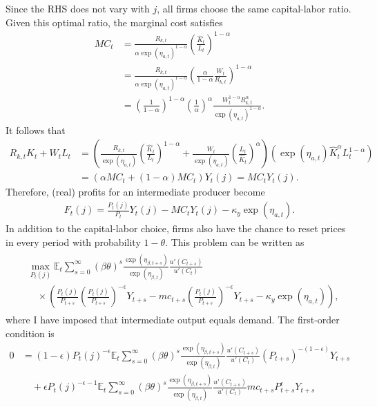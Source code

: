 \documentclass[12 pt, oneside]{article}
\theoremstyle{definition}
\theoremstyle{definition}
\theoremstyle{definition}
\newcommand{\E}{\mathbb{E}}
\begin{document}
Since the RHS does not vary with $j$, all firms choose the same capital-labor ratio. Given this optimal ratio, the marginal cost satisfies
\begin{align*}
  MC_t & = \frac{R_{k, t}}{\alpha \exp(\eta_{a, t})^{1 - \alpha}}\left(\frac{\hat{K}_t}{L_t}\right)^{1 - \alpha}\\
       & =  \frac{R_{k, t}}{\alpha \exp(\eta_{a, t})^{1 - \alpha}}\left(\frac{\alpha}{1 - \alpha} \frac{W_t}{R_{k, t}}\right)^{1 - \alpha}\\
       & =  \left(\frac{1}{1 - \alpha}\right)^{1 - \alpha}\left(\frac{1}{\alpha}\right)^{\alpha}\frac{W_t^{1 - \alpha}R_{k, t}^{\alpha}}{ \exp(\eta_{a, t})^{1 - \alpha}}.
\end{align*}
It follows that
\begin{align*}
  R_{k, t}\hat{K}_t + W_tL_t & = \left(\frac{R_{k, t}}{\exp(\eta_{a, t})}\left(\frac{\hat{K}_t}{L_t}\right)^{1 - \alpha} + \frac{W_t}{\exp(\eta_{a, t})}\left(\frac{L_t}{\hat{K}_t}\right)^{\alpha}\right)(\exp(\eta_{a, t})\hat{K}_t^\alpha L_t^{1 - \alpha})\\
                       & = \left(\alpha MC_t + (1 - \alpha)MC_t\right)Y_t(j) = MC_t Y_t(j).
\end{align*}
Therefore, (real) profits for an intermediate producer become
\begin{align}
  F_t(j) = \frac{P_t(j)}{P_t}Y_t(j) - MC_t Y_t(j) - \kappa_y \exp(\eta_{a, t}).
\end{align}
In addition to the capital-labor choice, firms also have the chance to reset prices in every period with probability $1 - \theta$. This problem can be
written as
\begin{align}
  \begin{split}
  &\max_{P_t(j)} \E_t\sum_{s = 0}^\infty(\beta \theta)^s\frac{\exp(\eta_{\beta, t + s})}{\exp(\eta_{\beta, t})}\frac{u'(C_{t + s})}{u'(C_t)}\\
&\quad \times\left(\frac{P_t(j)}{P_{t + s}}\left(\frac{P_t(j)}{P_{t + s}}\right)^{-\epsilon}Y_{t + s} - mc_{t + s}\left(\frac{P_t(j)}{P_{t + s}}\right)^{-\epsilon}Y_{t + s} - \kappa_y\exp(\eta_{a, t})\right),
  \end{split}
\end{align}
where I have imposed that intermediate output equals demand. The first-order condition is
\begin{align*}
0 & =  (1 - \epsilon)P_t(j)^{-\epsilon}\E_t\sum_{s = 0}^\infty (\beta\theta)^s \frac{\exp(\eta_{\beta, t + s})}{\exp(\eta_{\beta, t})}\frac{u'(C_{t + s})}{u'(C_t)}(P_{t + s})^{-(1 - \epsilon)}Y_{t + s}\\
  &\quad + \epsilon P_t(j)^{-\epsilon - 1}\E_t\sum_{s = 0}^\infty (\beta\theta)^s \frac{\exp(\eta_{\beta, t + s})}{\exp(\eta_{\beta, t})}\frac{u'(C_{t + s})}{u'(C_t)} mc_{t + s}P_{t + s}^{\epsilon}Y_{t + s}
\end{align*}
\end{document}
